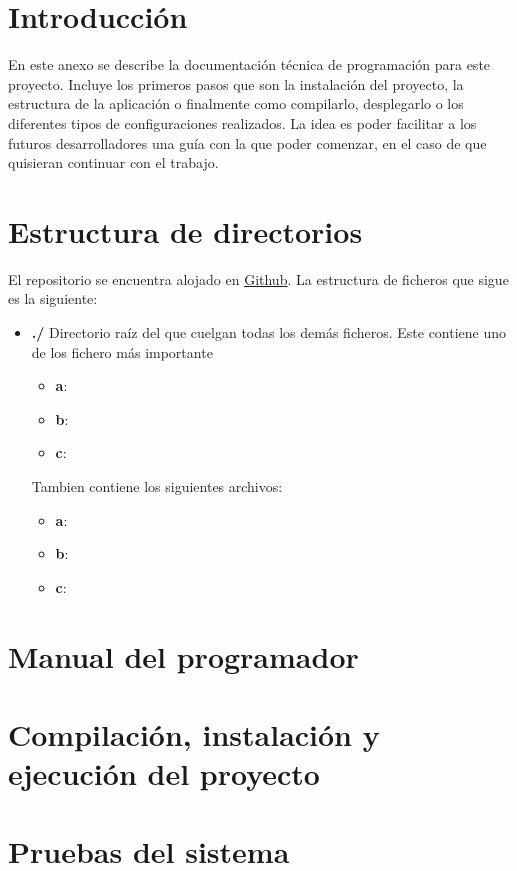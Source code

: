 
\section{Introducción}
En este anexo se describe la documentación técnica de programación para este proyecto. Incluye los primeros pasos que son la instalación del proyecto, la estructura de la aplicación o finalmente como compilarlo, desplegarlo o los diferentes tipos de configuraciones realizados. La idea es poder facilitar a los futuros desarrolladores una guía con la que poder comenzar, en el caso de que quisieran continuar con el trabajo.

\section{Estructura de directorios}
El repositorio se encuentra alojado en \href{https://github.com/scc0034/flutter_serpiente}{Github}. La estructura de ficheros que sigue es la siguiente:

\begin{itemize}
\item \textbf{./}
Directorio raíz del que cuelgan todas los demás ficheros. Este contiene uno de los fichero más importante

\begin{itemize}
	\item \textbf{a}: 
	\item \textbf{b}: 
	\item \textbf{c}: 
\end{itemize}

Tambien contiene los siguientes archivos:
\begin{itemize}
	\item \textbf{a}: 
	\item \textbf{b}:
	\item \textbf{c}:
\end{itemize}


\end{itemize}

\section{Manual del programador}

\section{Compilación, instalación y ejecución del proyecto}

\section{Pruebas del sistema}
